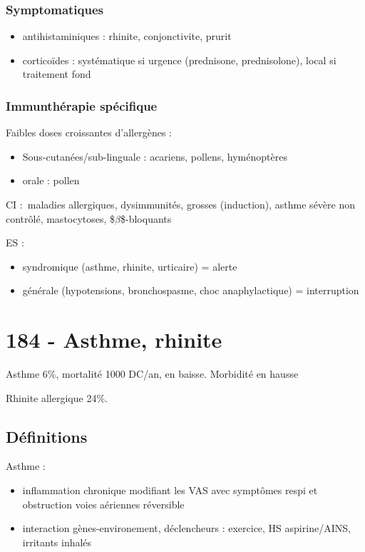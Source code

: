 \documentclass{book}
\begin{document}
\subsubsection{Symptomatiques}
\label{sec:org48bab69}

\begin{itemize}
\item antihistaminiques : rhinite, conjonctivite, prurit
\item corticoïdes : systématique si urgence (prednisone, prednisolone), local
si traitement fond
\end{itemize}


\subsubsection{Immunthérapie spécifique}
\label{sec:orgbd66cc8}
Faibles doses croissantes d'allergènes :

\begin{itemize}
\item Sous-cutanées/sub-linguale : acariens, pollens, hyménoptères
\item orale : pollen
\end{itemize}

CI : maladies allergiques, dysimmunités, grosses (induction), asthme sévère non
contrôlé, mastocytoses, \$\(\beta\)\$-bloquants

ES : 

\begin{itemize}
\item syndromique (asthme, rhinite, urticaire) = alerte
\item générale (hypotensions, bronchospasme, choc anaphylactique) =
interruption
\end{itemize}

\section{184 \textdagger{} - Asthme, rhinite}
\label{sec:org562beb1}
Asthme 6\%, mortalité 1000 DC/an, en baisse. Morbidité en hausse

Rhinite allergique 24\%.
\subsection{Définitions}
\label{sec:org3a5ef5f}
Asthme : 

\begin{itemize}
\item inflammation chronique modifiant les VAS avec symptômes respi et obstruction voies aériennes réversible
\item interaction gènes-environement, déclencheurs : exercice, HS aspirine/AINS,
irritants inhalés
\end{itemize}
\end{document}

